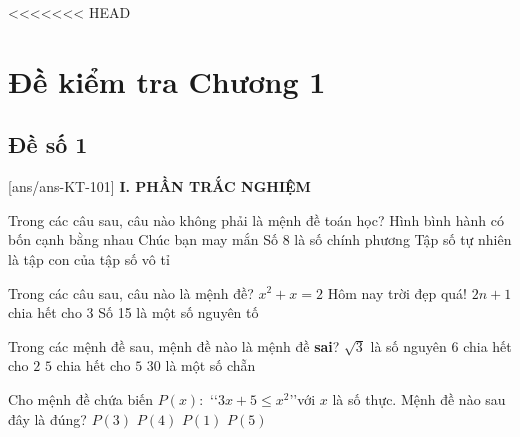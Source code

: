<<<<<<< HEAD
\section*{Đề kiểm tra Chương 1}
\subsection*{Đề số 1}
\setcounter{ex}{0}\setcounter{bt}{0}
[ans/ans-KT-101]
\noindent\textbf{I. PHẦN TRẮC NGHIỆM}
\begin{ex}%
	Trong các câu sau, câu nào không phải là mệnh đề toán học?
	\choice
	{Hình bình hành có bốn cạnh bằng nhau}
	{\True Chúc bạn may mắn}
	{Số $8$ là số chính phương}
	{Tập số tự nhiên là tập con của tập số vô tỉ}
\end{ex}
\begin{ex}%
	Trong các câu sau, câu nào là mệnh đề?
	\choice
	{$x^2+x=2$}
	{Hôm nay trời đẹp quá!}
	{$2n+1$ chia hết cho 3}
	{\True Số 15 là một số nguyên tố}
\end{ex}
\begin{ex}%
	Trong các mệnh đề sau, mệnh đề nào là mệnh đề \textbf{sai}?
	\choice
	{\True $\sqrt{3}$ là số nguyên}
	{$6$ chia hết cho $2$}
	{$5$ chia hết cho $5$}
	{$30$ là một số chẵn}
\end{ex}
\begin{ex}%
	Cho mệnh đề chứa biến $P(x)\colon$ \lq\lq $3x+5\le x^2$\rq\rq với $x$ là số thực. Mệnh đề nào sau đây là đúng?
	\choice
	{$P(3)$}
	{$P(4)$}
	{$P(1)$}
	{\True $P(5)$}
\end{ex}
